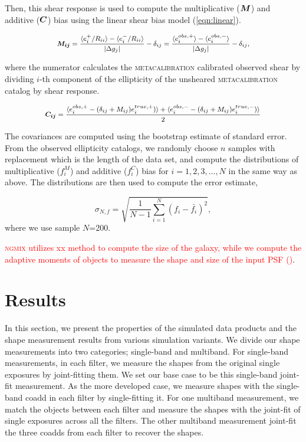 \documentclass[fleqn,usenatbib]{mnras}
\begin{document}
Then, this shear response is used to compute the multiplicative ($\vb*{M}$) and additive ($\vb*{C}$) bias using the linear shear bias model (\ref{eqn:linear}). 


\begin{equation}
    \small
    \vb*{M_{ij}} = 
    \frac{\langle e^{+}_{i}/R_{ii} \rangle - \langle e^{-}_{i}/R_{ii} \rangle}{\abs{\Delta g_{j}}} - \delta_{ij} 
    = \frac{\langle e^{obs,+}_{i}\rangle - \langle e^{obs,-}_{i}\rangle}{\abs{\Delta g_{j}}} - \delta_{ij}, 
\end{equation}


where the numerator calculates the \textsc{metacalibration} calibrated observed shear by dividing $i$-th component of the ellipticity of the unsheared \textsc{metacalibration} catalog by shear response.


\begin{equation}
    \small
    \vb*{C_{ij}} = \frac{\langle e^{obs,+}_{i} - (\delta_{ij}+M_{ij})e^{true,+}_{i})\rangle + \langle e^{obs,-}_{i} - (\delta_{ij}+M_{ij})e^{true,-}_{i}) \rangle}{2}
\end{equation}


The covariances are computed using the bootstrap estimate of standard error. From the observed ellipticity catalogs, we randomly choose $n$ samples with replacement which is the length of the data set, and compute the distributions of multiplicative ($f^{M}_{i}$) and additive ($f^{C}_{i}$) bias for $i=1,2,3,...,N$ in the same way as above. The distributions are then used to compute the error estimate,  


\begin{equation}
    \sigma_{N,f} = \sqrt{\frac{1}{N-1} \sum_{i=1}^{N}(f_{i}-\bar{f_{i}})^{2}}, 
\end{equation}
where we use sample $N$=200. 

\textcolor{red}{\textsc{ngmix} utilizes xx method to compute the size of the galaxy, while we compute the adaptive moments of objects to measure the shape and size of the input PSF (\citealt{2003MNRAS.343..459H})}. 


\section{Results}
\label{sec:results}
In this section, we present the properties of the simulated data products and the shape measurement results from various simulation variants. We divide our shape measurements into two categories; single-band and multiband. For single-band measurements, in each filter, we measure the shapes from the original single exposures by joint-fitting them. We set our base case to be this single-band joint-fit measurement. As the more developed case, we measure shapes with the single-band coadd in each filter by single-fitting it. For one multiband measurement, we match the objects between each filter and measure the shapes with the joint-fit of single exposures across all the filters. The other multiband measurement joint-fit the three coadds from each filter to recover the shapes. 
\end{document}
